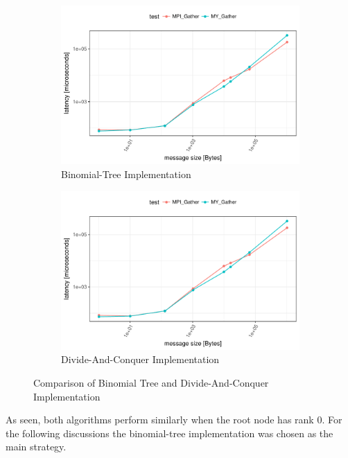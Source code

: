 \begin{figure}[h]
  \centering
  \begin{subfigure}[b]{0.49\textwidth}
        \includegraphics[width=\textwidth]{../benchmarks/openmpi/binom/gather_32/runtime.pdf}
        \caption{Binomial-Tree Implementation}
    \end{subfigure}
    \begin{subfigure}[b]{0.49\textwidth}
        \includegraphics[width=\textwidth]{../benchmarks/openmpi/divide_conquer/gather32/runtime.pdf}
        \caption{Divide-And-Conquer Implementation}
    \end{subfigure}
    \caption{Comparison of Binomial Tree and Divide-And-Conquer Implementation}
    \label{fig:gather:binom_vs_dac}
\end{figure}

As seen, both algorithms perform similarly when the root node has rank 0. For the following discussions the binomial-tree implementation was chosen as the main strategy.

